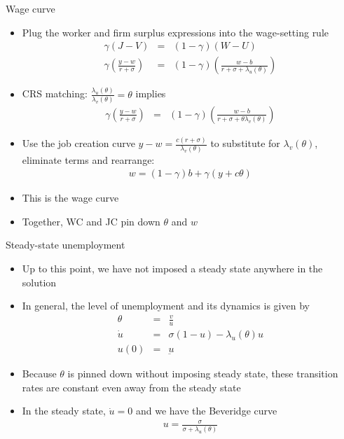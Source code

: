\documentclass[9pt]{beamer}
\newcommand{\bit}{\begin{itemize}}
\newcommand{\eit}{\end{itemize}}
\newcommand{\bc}{\color{blue}}
\begin{document}
\begin{frame}{Wage curve}

\bit
\setlength\itemsep{1em}

\item Plug the worker and firm surplus expressions into the wage-setting rule
\begin{eqnarray}
\gamma (J-V) &=& (1-\gamma) (W-U) \nonumber \\
\gamma \left(\frac{y-w}{r+\sigma} \right) &=& (1-\gamma) \left(\frac{w-b}{r+\sigma + \lambda_u(\theta)}  \right) \nonumber 
\end{eqnarray}

\item CRS matching: $\frac{\lambda_u(\theta)}{\lambda_v(\theta)}=\theta$ implies
\begin{eqnarray}
\gamma \left(\frac{y-w}{r+\sigma} \right) &=& (1-\gamma) \left(\frac{w-b}{r+\sigma + \theta \lambda_v(\theta)}  \right) \nonumber 
\end{eqnarray}

\item Use the job creation curve $y-w = \frac{c(r+\sigma)}{\lambda_v(\theta)}$ to substitute for $\lambda_v(\theta)$, eliminate terms and rearrange:
\begin{eqnarray}
w = (1-\gamma)b + \gamma (y +c \theta) \nonumber
\end{eqnarray}

\item This is the {\bc wage curve}

\item Together, WC and JC pin down $\theta$ and $w$

\eit
\end{frame}

\begin{frame}{Steady-state unemployment}

\bit
\setlength\itemsep{1em}

\item Up to this point, we have not imposed a steady state anywhere in the solution

\item In general, the level of unemployment and its dynamics is given by
\begin{eqnarray}
\theta &=& \frac{v}{u} \nonumber \\
\dot{u} &=& \sigma (1-u) - \lambda_u(\theta)u \nonumber \\
u(0) &=& \underbar{u} \nonumber
\end{eqnarray}

\item Because $\theta$ is pinned down without imposing steady state, these transition rates are constant even away from the steady state

\item In the steady state, $\dot{u}=0$ and we have the Beveridge curve
\begin{eqnarray}
u = \frac{\sigma}{\sigma + \lambda_u(\theta)} \nonumber
\end{eqnarray}

\eit
\end{frame}
\end{document}
